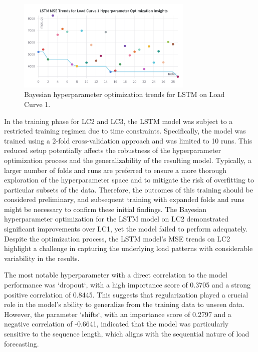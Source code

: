 \documentclass{article} %
\begin{document}
\begin{figure}[H]
    \centering
    \includegraphics[width=0.75\textwidth]{ressources/Hyperparams/LSTM/LSTM MSE Trends for Load Curve 1 Hyperparameter Optimization Insights.png}
    \caption{Bayesian hyperparameter optimization trends for LSTM on Load Curve 1.}
    \label{fig:lstm_lc1}
\end{figure}
In the training phase for \gls*{LC2} and \gls*{LC3}, the LSTM model was subject to a restricted training regimen due to time constraints. Specifically, the model was trained using a 2-fold cross-validation approach and was limited to 10 runs. This reduced setup potentially affects the robustness of the hyperparameter optimization process and the generalizability of the resulting model. Typically, a larger number of folds and runs are preferred to ensure a more thorough exploration of the hyperparameter space and to mitigate the risk of overfitting to particular subsets of the data. Therefore, the outcomes of this training should be considered preliminary, and subsequent training with expanded folds and runs might be necessary to confirm these initial findings.
The Bayesian hyperparameter optimization for the \gls*{LSTM} model on \gls*{LC2} demonstrated significant improvements over \gls*{LC1}, yet the model failed to perform adequately. Despite the optimization process, the \gls*{LSTM} model's \gls*{MSE} trends on \gls*{LC2} highlight a challenge in capturing the underlying load patterns with considerable variability in the results.

The most notable hyperparameter with a direct correlation to the model performance was `dropout`, with a high importance score of 0.3705 and a strong positive correlation of 0.8445. This suggests that regularization played a crucial role in the model's ability to generalize from the training data to unseen data. However, the parameter `shifts`, with an importance score of 0.2797 and a negative correlation of -0.6641, indicated that the model was particularly sensitive to the sequence length, which aligns with the sequential nature of load forecasting.
\end{document}
